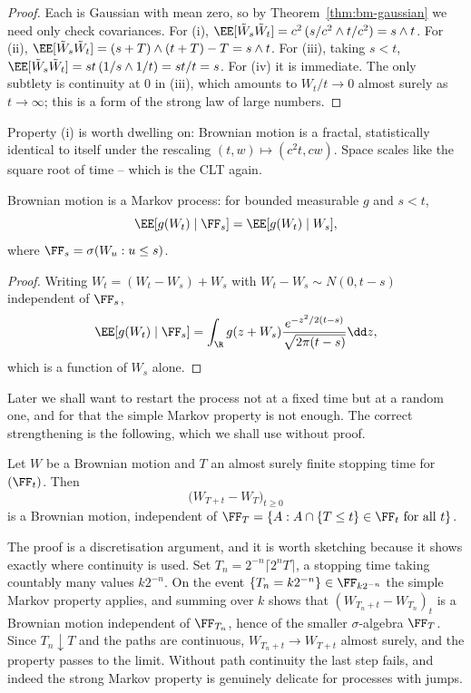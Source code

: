 \begin{proof}
	Each is Gaussian with mean zero, so by Theorem~\ref{thm:bm-gaussian} we need only check covariances. For (i), $\EE[\tilde W_s\tilde W_t] = c^2\,(s/c^2 \wedge t/c^2) = s\wedge t$. For (ii), $\EE[\tilde W_s \tilde W_t] = (s+T)\wedge(t+T) - T = s\wedge t$. For (iii), taking $s<t$, $\EE[\tilde W_s\tilde W_t] = st\,(1/s \wedge 1/t) = st/t = s$. For (iv) it is immediate. The only subtlety is continuity at $0$ in (iii), which amounts to $W_t/t \to 0$ almost surely as $t\to\infty$; this is a form of the strong law of large numbers.
\end{proof}

Property (i) is worth dwelling on: Brownian motion is a fractal, statistically identical to itself under the rescaling $(t,w)\mapsto(c^2t, cw)$. Space scales like the square root of time -- which is the CLT again.

\begin{theorem}
	Brownian motion is a Markov process: for bounded measurable $g$ and $s<t$,
	$$
	\EE[g(W_t)\mid\FF_s] = \EE[g(W_t)\mid W_s],
	$$
	where $\FF_s = \sigma(W_u : u \leq s)$.
\end{theorem}

\begin{proof}
	Writing $W_t = (W_t - W_s) + W_s$ with $W_t-W_s\sim N(0,t-s)$ independent of $\FF_s$,
	$$
	\EE[g(W_t)\mid\FF_s] = \int_\R g(z + W_s)\frac{e^{-z^2/2(t-s)}}{\sqrt{2\pi(t-s)}}\dd z,
	$$
	which is a function of $W_s$ alone.
\end{proof}

Later we shall want to restart the process not at a fixed time but at a random one, and for that the simple Markov property is not enough. The correct strengthening is the following, which we shall use without proof.

\begin{theorem}\label{thm:strong-markov}
	Let $W$ be a Brownian motion and $T$ an almost surely finite stopping time for $(\FF_t)$. Then
	$$
	\big(W_{T+t} - W_T\big)_{t\geq0}
	$$
	is a Brownian motion, independent of $\FF_T = \{A : A \cap \{T\leq t\} \in \FF_t \text{ for all } t\}$.
\end{theorem}

\begin{remark}
	The proof is a discretisation argument, and it is worth sketching because it shows exactly where continuity is used. Set $T_n = 2^{-n}\lceil 2^nT\rceil$, a stopping time taking countably many values $k2^{-n}$. On the event $\{T_n = k2^{-n}\}\in\FF_{k2^{-n}}$ the simple Markov property applies, and summing over $k$ shows that $(W_{T_n+t}-W_{T_n})_t$ is a Brownian motion independent of $\FF_{T_n}$, hence of the smaller $\sigma$-algebra $\FF_T$. Since $T_n \downarrow T$ and the paths are continuous, $W_{T_n+t}\to W_{T+t}$ almost surely, and the property passes to the limit. Without path continuity the last step fails, and indeed the strong Markov property is genuinely delicate for processes with jumps.
\end{remark}

